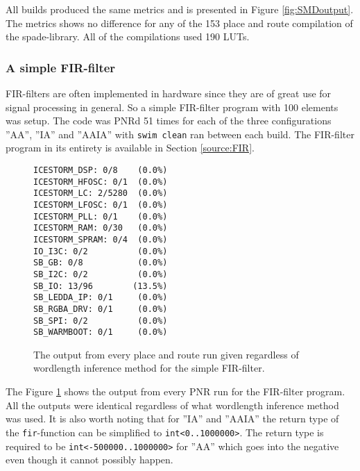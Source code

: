\documentclass[msc,lith,english]{liuthesis}
\begin{document}
All builds produced the same metrics and is presented in Figure \ref{fig:SMDoutput}. The metrics shows no difference for any of the 153 place and route compilation of the spade-library. All of the compilations used 190 LUTs. 

\subsubsection{A simple FIR-filter}
FIR-filters are often implemented in hardware since they are of great use for signal processing in general. So a simple FIR-filter program with 100 elements was setup. The code was PNRd 51 times for each of the three configurations ''AA'', ''IA'' and ''AAIA'' with \verb+swim clean+ ran between each build. The FIR-filter program in its entirety is available in Section \ref{source:FIR}.

\begin{figure}
\begin{center}
\begin{verbatim}
ICESTORM_DSP: 0/8    (0.0%)
ICESTORM_HFOSC: 0/1  (0.0%)
ICESTORM_LC: 2/5280  (0.0%)
ICESTORM_LFOSC: 0/1  (0.0%)
ICESTORM_PLL: 0/1    (0.0%)
ICESTORM_RAM: 0/30   (0.0%)
ICESTORM_SPRAM: 0/4  (0.0%)
IO_I3C: 0/2          (0.0%)
SB_GB: 0/8           (0.0%)
SB_I2C: 0/2          (0.0%)
SB_IO: 13/96        (13.5%)
SB_LEDDA_IP: 0/1     (0.0%)
SB_RGBA_DRV: 0/1     (0.0%)
SB_SPI: 0/2          (0.0%)
SB_WARMBOOT: 0/1     (0.0%)
\end{verbatim}
\end{center}

  \caption{The output from every place and route run given regardless of wordlength inference method for the simple FIR-filter.}
  \label{fig:FIRoutput}
\end{figure}

The Figure \ref{fig:FIRoutput} shows the output from every PNR run for the FIR-filter program. All the outputs were identical regardless of what wordlength inference method was used. It is also worth noting that for ''IA'' and ''AAIA'' the return type of the \verb+fir+-function can be simplified to \verb+int<0..1000000>+. The return type is required to be \verb+int<-500000..1000000>+ for ''AA'' which goes into the negative even though it cannot possibly happen.


\end{document}
